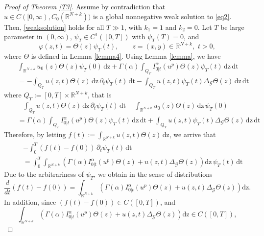 \documentclass[reqno,11pt]{amsart}
\numberwithin{equation}{section}
\def\R{{\mathbb {R}}}
\def\R{\mathbb{R}}
\begin{document}
\begin{proof}[Proof of Theorem \ref{T3}]%
	
	
	Assume by contradiction that $u\in C([0,\infty),C_0(\R^{N+k}))$ is a global nonnegative weak solution to \eqref{eq2}. Then, \eqref{weaksolution} holds for all $T\gg1$, with $k_1=1$ and $k_2=0$. Let $T$ be large parameter in $(0,\infty)$, $\psi_T\in C^1([0,T])$ with $\psi_T(T)=0$, and
	$$\varphi(z,t)=\Theta(z)\psi_T(t),\qquad z=(x,y)\in\mathbb{R}^{N+k},\,\,t> 0,$$
	where $\Theta$ is defined  in Lemma \ref{lemma4}. Using Lemma \ref{lemma}, we have
	\begin{eqnarray*}
		&&\int_{\R^{N+k}}u_0(z)\Theta(z) \psi_T(0)\,\mathrm{dz}+\Gamma(\alpha)\int_{Q_T}I^\alpha_{0|t}(u^{p})\Theta(z)\psi_T(t)\,\mathrm{dz}\,\mathrm{dt}\nonumber\\
		&&=-\int_{Q_T}u(z,t)\Theta(z)\,\mathrm{dz}\,\partial_t\psi_T(t)\,\mathrm{dt} -\int_{Q_T}u(z,t)\psi_T(t)\Delta_{\mathcal{G}}\Theta(z)\,\mathrm{dz}\,\mathrm{dt}
	\end{eqnarray*}
	where $Q_T:=[0,T]\times \mathbb{R}^{N+k}$, that is
	\begin{eqnarray*}
		&&-\int_{Q_T}u(z,t)\Theta(z)\,\mathrm{dz}\,\partial_t\psi_T(t)\,\mathrm{dt} -\int_{\R^{N+k}}u_0(z)\Theta(z)\,\mathrm{dz}\,\psi_T(0)\nonumber\\
		&&=\Gamma(\alpha)\int_{Q_T}I^\alpha_{0|t}(u^{p})\Theta(z)\psi_T(t)\,\mathrm{dz}\,\mathrm{dt}+\int_{Q_T}u(z,t)\psi_T(t)\Delta_{\mathcal{G}}\Theta(z)\,\mathrm{dz}\,\mathrm{dt}
	\end{eqnarray*}
	Therefore, by letting $f(t):= \displaystyle\int_{\R^{N+k}}u(z,t)\Theta(z)\,\mathrm{dz}$, we arrive that
	\begin{eqnarray*}
		&&-\int_0^T(f(t)-f(0))\,\partial_t\psi_T(t)\,\mathrm{dt} \nonumber\\
		&&=\int_0^T\int_{\R^{N+k}}\left(\Gamma(\alpha)I^\alpha_{0|t}(u^{p})\Theta(z)+u(z,t)\Delta_{\mathcal{G}}\Theta(z)\right)\mathrm{dz}\,\psi_T(t)\,\mathrm{dt}
	\end{eqnarray*}	
	Due to the arbitrariness of $\psi_T$, we obtain in the sense of distributions	
	\begin{equation}\label{500}
		\frac{d}{dt}(f(t)-f(0)) =\int_{\R^{N+k}}\left(\Gamma(\alpha)I^\alpha_{0|t}(u^{p})\Theta(z)+u(z,t)\Delta_{\mathcal{G}}\Theta(z)\right)\mathrm{dz}.
	\end{equation}	
	In addition, since $(f(t)-f(0))\in C([0,T])$, and 
	$$
	\int_{\R^{N+k}}\left(\Gamma(\alpha)I^\alpha_{0|t}(u^{p})\Theta(z)+u(z,t)\Delta_{\mathcal{G}}\Theta(z)\right)\mathrm{dz}\in C([0,T]),
$$
\end{proof}
\end{document}
